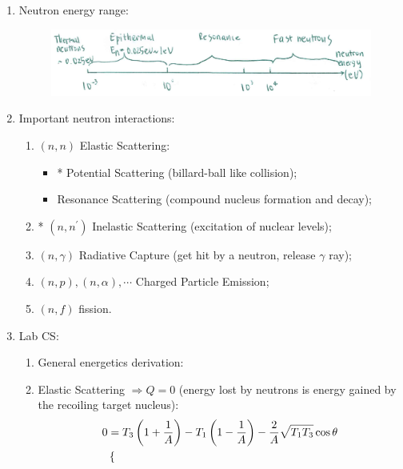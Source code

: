 \documentclass{school-22.101-notes}
\begin{document}
\clearpage
\begin{enumerate}
\item Neutron energy range:
    \begin{figure}[ht]
        \centering
        \includegraphics[width=5in]{images/ni/neutron-energy.png}
    \end{figure}
%    
\item Important neutron interactions:
    \begin{enumerate}
    \item $(n,n)$ Elastic Scattering: 
        \begin{itemize}
        \item* Potential Scattering (billard-ball like collision);
        \item Resonance Scattering (compound nucleus formation and decay);
        \end{itemize}
    \item* $(n,n^{\prime})$ Inelastic Scattering (excitation of nuclear levels);
    \item $(n, \gamma)$ Radiative Capture (get hit by a neutron, release $\gamma$ ray);
    \item $(n, p), (n,\alpha), \cdots$ Charged Particle Emission;
    \item $(n, f)$ fission.     
    \end{enumerate}
%
\item Lab CS: 
\begin{enumerate}
    \item General energetics derivation: 
    \item Elastic Scattering $\Rightarrow Q=0$ (energy lost by neutrons is energy gained by the recoiling target nucleus):
        \begin{align}
        0 &= T_3 \left( 1 + \frac{1}{A} \right)  - T_1 \left( 1 - \frac{1}{A} \right) - \frac{2}{A} \sqrt{ T_1 T_3} \cos \theta \\
        &\begin{dcases*}

\end{dcases*}
\end{align}
\end{enumerate}
\end{enumerate}
\end{document}
